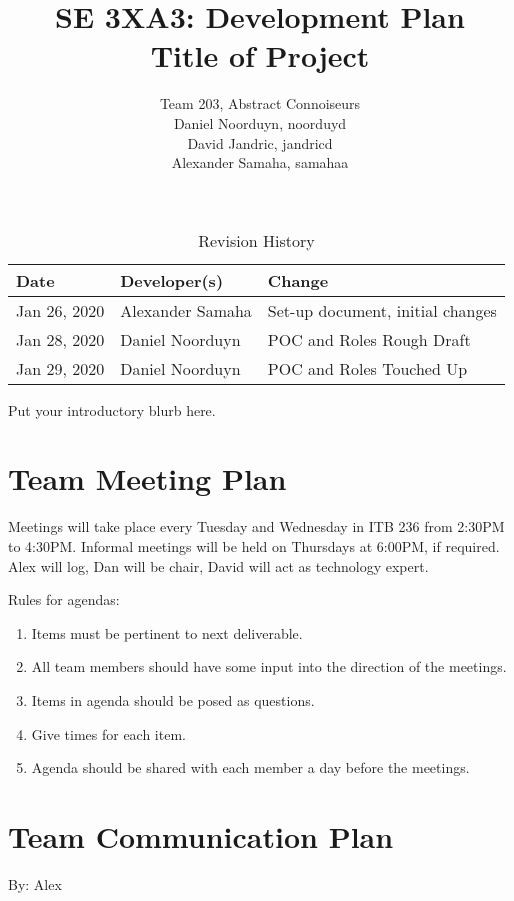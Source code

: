 \documentclass{article}
\title{SE 3XA3: Development Plan\\Title of Project}
\author{Team 203, Abstract Connoiseurs\\
Daniel Noorduyn, noorduyd\\
David Jandric, jandricd\\
Alexander Samaha, samahaa\\
}
\date{}
\begin{document}
\begin{table}[hp]
\caption{Revision History} \label{TblRevisionHistory}
\begin{tabularx}{\textwidth}{llX}
\toprule
\textbf{Date} & \textbf{Developer(s)} & \textbf{Change}\\
\midrule
Jan 26, 2020 & Alexander Samaha & Set-up document, initial changes\\
Jan 28, 2020 & Daniel Noorduyn & POC and Roles Rough Draft\\
Jan 29, 2020 & Daniel Noorduyn & POC and Roles Touched Up\\
\bottomrule
\end{tabularx}
\end{table}

\newpage

\maketitle

Put your introductory blurb here.

\section{Team Meeting Plan}

Meetings will take place every Tuesday and Wednesday in ITB 236 from 2:30PM to
4:30PM. Informal meetings will be held on Thursdays at 6:00PM, if required.
Alex will log, Dan will be chair, David will act as technology expert.

Rules for agendas:
\begin{enumerate}
    \item Items must be pertinent to next deliverable.
    \item All team members should have some input into the direction of the meetings.
    \item Items in agenda should be posed as questions.
    \item Give times for each item.
    \item Agenda should be shared with each member a day before the meetings.
\end{enumerate}

\section{Team Communication Plan}
By: Alex
\end{document}
